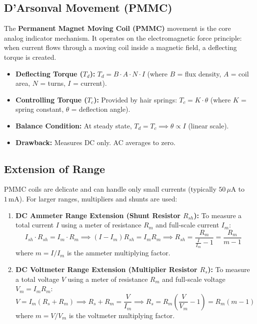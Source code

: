 \documentclass[12pt,a4paper]{article}
\begin{document}
\subsection{D'Arsonval Movement (PMMC)}
The \textbf{Permanent Magnet Moving Coil (PMMC)} movement is the core analog indicator mechanism. It operates on the electromagnetic force principle: when current flows through a moving coil inside a magnetic field, a deflecting torque is created.
\begin{itemize}[leftmargin=*, itemsep=3.5pt]
  \item \textbf{Deflecting Torque ($T_d$):} $T_d = B \cdot A \cdot N \cdot I$ (where $B$ = flux density, $A$ = coil area, $N$ = turns, $I$ = current).
  \item \textbf{Controlling Torque ($T_c$):} Provided by hair springs: $T_c = K \cdot \theta$ (where $K$ = spring constant, $\theta$ = deflection angle).
  \item \textbf{Balance Condition:} At steady state, $T_d = T_c \implies \theta \propto I$ (linear scale).
  \item \textbf{Drawback:} Measures DC only. AC averages to zero.
\end{itemize}

\subsection{Extension of Range}
PMMC coils are delicate and can handle only small currents (typically $50\,\mu\text{A}$ to $1\,\text{mA}$). For larger ranges, multipliers and shunts are used:

\begin{tcolorbox}[formulabox, title={\textbf{Range Extension Calculations}}]
\begin{enumerate}[leftmargin=*, itemsep=4pt, label=\arabic*.]
  \item \textbf{DC Ammeter Range Extension (Shunt Resistor $R_{sh}$):}
    To measure a total current $I$ using a meter of resistance $R_m$ and full-scale current $I_m$:
    $$I_{sh} \cdot R_{sh} = I_m \cdot R_m \implies (I - I_m)R_{sh} = I_m R_m \implies R_{sh} = \frac{R_m}{\frac{I}{I_m} - 1} = \frac{R_m}{m - 1}$$
    where $m = I/I_m$ is the ammeter multiplying factor.
  \item \textbf{DC Voltmeter Range Extension (Multiplier Resistor $R_s$):}
    To measure a total voltage $V$ using a meter of resistance $R_m$ and full-scale voltage $V_m = I_m R_m$:
    $$V = I_m (R_s + R_m) \implies R_s + R_m = \frac{V}{I_m} \implies R_s = R_m \left(\frac{V}{V_m} - 1\right) = R_m(m - 1)$$
    where $m = V/V_m$ is the voltmeter multiplying factor.
\end{enumerate}
\end{tcolorbox}
\end{document}
